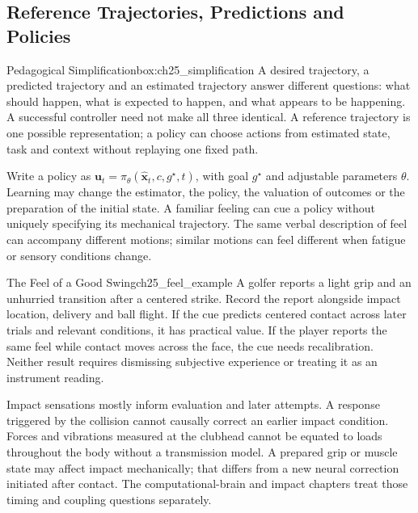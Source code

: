 \subsection{Reference Trajectories, Predictions and Policies}
\label{subsec:ch25_reference_trajectory}

\begin{constraintbox}{Pedagogical Simplification}{box:ch25_simplification}
A desired trajectory, a predicted trajectory and an estimated trajectory answer different questions: what should happen, what is expected to happen, and what appears to be happening. A successful controller need not make all three identical. A reference trajectory is one possible representation; a policy can choose actions from estimated state, task and context without replaying one fixed path.
\end{constraintbox}

Write a policy as $\bm{u}_t=\pi_\theta(\hat{\bm{x}}_t,c,g^\star,t)$, with goal $g^\star$ and adjustable parameters $\theta$. Learning may change the estimator, the policy, the valuation of outcomes or the preparation of the initial state. A familiar feeling can cue a policy without uniquely specifying its mechanical trajectory. The same verbal description of feel can accompany different motions; similar motions can feel different when fatigue or sensory conditions change.

\begin{example}{The Feel of a Good Swing}{ch25_feel_example}
A golfer reports a light grip and an unhurried transition after a centered strike. Record the report alongside impact location, delivery and ball flight. If the cue predicts centered contact across later trials and relevant conditions, it has practical value. If the player reports the same feel while contact moves across the face, the cue needs recalibration. Neither result requires dismissing subjective experience or treating it as an instrument reading.
\end{example}

Impact sensations mostly inform evaluation and later attempts. A response triggered by the collision cannot causally correct an earlier impact condition. Forces and vibrations measured at the clubhead cannot be equated to loads throughout the body without a transmission model. A prepared grip or muscle state may affect impact mechanically; that differs from a new neural correction initiated after contact. The computational-brain and impact chapters treat those timing and coupling questions separately.

